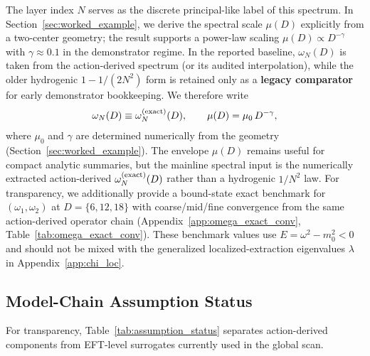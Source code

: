 \documentclass[aps,prd,onecolumn,notitlepage,nofootinbib,superscriptaddress,11pt,floatfix]{revtex4-2}
\begin{document}
The layer index $N$ serves as the discrete principal-like label of this spectrum. In Section~\ref{sec:worked_example}, we derive the spectral scale $\mu(D)$ explicitly from a two-center geometry; the result supports a power-law scaling $\mu(D) \propto D^{-\gamma}$ with $\gamma \approx 0.1$ in the demonstrator regime. In the reported baseline, $\omega_N(D)$ is taken from the action-derived spectrum (or its audited interpolation), while the older hydrogenic $1-1/(2N^2)$ form is retained only as a \textbf{legacy comparator} for early demonstrator bookkeeping. We therefore write
\begin{equation}
\omega_N(D) \equiv \omega_N^{\rm(exact)}(D), \qquad \mu(D) = \mu_0 \, D^{-\gamma},
\label{eq:omega_N}
\end{equation}
where $\mu_0$ and $\gamma$ are determined numerically from the geometry (Section~\ref{sec:worked_example}). The envelope $\mu(D)$ remains useful for compact analytic summaries, but the mainline spectral input is the numerically extracted action-derived $\omega_N^{\rm(exact)}(D)$ rather than a hydrogenic $1/N^2$ law.
For transparency, we additionally provide a bound-state exact benchmark for $(\omega_1,\omega_2)$ at $D=\{6,12,18\}$ with coarse/mid/fine convergence from the same action-derived operator chain (Appendix~\ref{app:omega_exact_conv}, Table~\ref{tab:omega_exact_conv}). These benchmark values use $E=\omega^2-m_0^2<0$ and should not be mixed with the generalized localized-extraction eigenvalues $\lambda$ in Appendix~\ref{app:chi_loc}.

\subsection{Model-Chain Assumption Status}
\label{sec:assumption_status}
For transparency, Table~\ref{tab:assumption_status} separates action-derived components from EFT-level surrogates currently used in the global scan.
\end{document}
